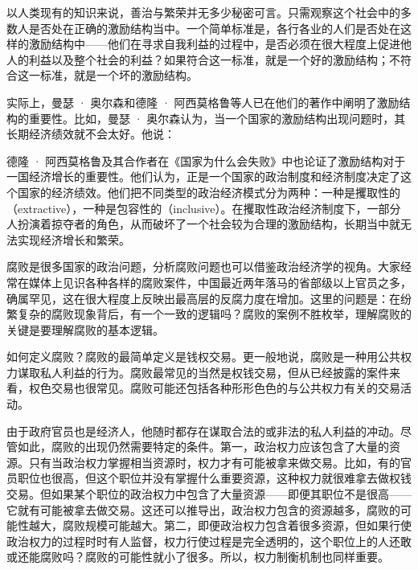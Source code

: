 以人类现有的知识来说，善治与繁荣并无多少秘密可言。只需观察这个社会中的多数人是否处在正确的激励结构当中。一个简单标准是，各行各业的人们是否处在这样的激励结构中——他们在寻求自我利益的过程中，是否必须在很大程度上促进他人的利益以及整个社会的利益？如果符合这一标准，就是一个好的激励结构；不符合这一标准，就是一个坏的激励结构。

实际上，曼瑟 · 奥尔森和德隆 · 阿西莫格鲁等人已在他们的著作中阐明了激励结构的重要性。比如，曼瑟 · 奥尔森认为，当一个国家的激励结构出现问题时，其长期经济绩效就不会太好。他说：


德隆 · 阿西莫格鲁及其合作者在《国家为什么会失败》中也论证了激励结构对于一国经济增长的重要性。他们认为，正是一个国家的政治制度和经济制度决定了这个国家的经济绩效。他们把不同类型的政治经济模式分为两种：一种是攫取性的（extractive），一种是包容性的（inclusive）。在攫取性政治经济制度下，一部分人扮演着掠夺者的角色，从而破坏了一个社会较为合理的激励结构，长期当中就无法实现经济增长和繁荣。


腐败是很多国家的政治问题，分析腐败问题也可以借鉴政治经济学的视角。大家经常在媒体上见识各种各样的腐败案件，中国最近两年落马的省部级以上官员之多，确属罕见，这在很大程度上反映出最高层的反腐力度在增加。这里的问题是：在纷繁复杂的腐败现象背后，有一个一致的逻辑吗？腐败的案例不胜枚举，理解腐败的关键是要理解腐败的基本逻辑。

如何定义腐败？腐败的最简单定义是钱权交易。更一般地说，腐败是一种用公共权力谋取私人利益的行为。腐败最常见的当然是权钱交易，但从已经披露的案件来看，权色交易也很常见。腐败可能还包括各种形形色色的与公共权力有关的交易活动。

由于政府官员也是经济人，他随时都存在谋取合法的或非法的私人利益的冲动。尽管如此，腐败的出现仍然需要特定的条件。第一，政治权力应该包含了大量的资源。只有当政治权力掌握相当资源时，权力才有可能被拿来做交易。比如，有的官员职位也很高，但这个职位并没有掌握什么重要资源，这种权力就很难拿去做权钱交易。但如果某个职位的政治权力中包含了大量资源——即便其职位不是很高——它就有可能被拿去做交易。这还可以推导出，政治权力包含的资源越多，腐败的可能性越大，腐败规模可能越大。第二，即便政治权力包含着很多资源，但如果行使政治权力的过程时时有人监督，权力行使过程是完全透明的，这个职位上的人还敢或还能腐败吗？腐败的可能性就小了很多。所以，权力制衡机制也同样重要。

